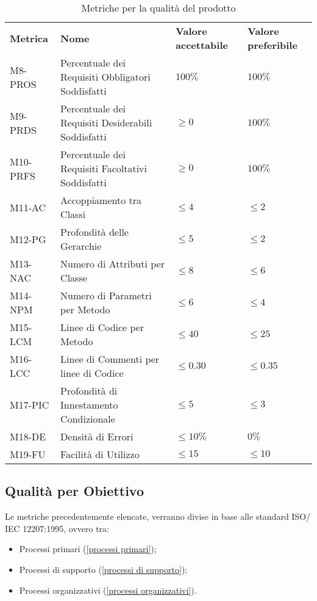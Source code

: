 \begin{table}[h]
    \begin{adjustbox}{width=\textwidth}
    \centering
    \renewcommand{\arraystretch}{1.5}
    \begin{tabular}{>{\centering\arraybackslash} m{2cm} >{\centering\arraybackslash} m{6cm} >{\centering\arraybackslash} m{3cm} >{\centering\arraybackslash} m{3cm}}
    \rowcolor[HTML]{bfbfbf} 
    \textbf{Metrica} & \textbf{Nome} & \textbf{Valore accettabile} & \textbf{Valore preferibile} \\
    M8-PROS & Percentuale dei Requisiti Obbligatori Soddisfatti &  $100\%$ & $100\%$\\
    M9-PRDS & Percentuale dei Requisiti Desiderabili Soddisfatti & $\ge 0$ & $100\%$\\
    M10-PRFS & Percentuale dei Requisiti Facoltativi Soddisfatti &   $\ge 0$ & $100\%$\\
    M11-AC & Accoppiamento tra Classi & $\le 4$ & $\le 2$ \\
    M12-PG & Profondità delle Gerarchie & $\le 5$ & $\le 2$\\
    M13-NAC & Numero di Attributi per Classe & $\le 8$ & $\le 6$ \\
    M14-NPM & Numero di Parametri per Metodo & $\le 6$ & $\le 4$ \\
    M15-LCM & Linee di Codice per Metodo & $\le 40$ & $\le 25$ \\
    M16-LCC & Linee di Commenti per linee di Codice & $\le 0.30$ & $\le 0.35$\\
    M17-PIC & Profondità di Innestamento Condizionale & $\le 5$ & $\le 3$\\
    M18-DE & Densità di Errori & $\le 10\%$ & $0\%$\\
    M19-FU & Facilità di Utilizzo & $\le 15$ & $\le 10$ \\ 
    \end{tabular}
    \end{adjustbox}
    \caption{Metriche per la qualità del prodotto}
\end{table}

\clearpage

\subsection{Qualità per Obiettivo}
Le metriche precedentemente elencate, verranno divise in base alle standard ISO/
IEC 12207:1995, ovvero tra:
\begin{itemize}
    \item Processi primari (\ref{processi primari});
    \item Processi di supporto (\ref{processi di supporto});
    \item Processi organizzativi (\ref{processi organizzativi}).
\end{itemize}

